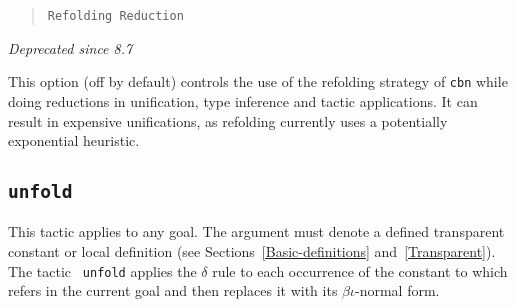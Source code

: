 \begin{coq_example*}

\begin{quote}
{\tt Refolding Reduction}
\end{quote}
\emph{Deprecated since 8.7}

This option (off by default) controls the use of the refolding strategy
of {\tt cbn} while doing reductions in unification, type inference and
tactic applications. It can result in expensive unifications, as
refolding currently uses a potentially exponential heuristic.

\subsection{\tt unfold \qualid}
\label{unfold}

This tactic applies to any goal. The argument {\qualid} must denote a
defined transparent constant or local definition (see Sections~\ref{Basic-definitions} and~\ref{Transparent}).  The tactic {\tt
  unfold} applies the $\delta$ rule to each occurrence of the constant
to which {\qualid} refers in the current goal and then replaces it
with its $\beta\iota$-normal form.

\begin{ErrMsgs}
\item {\qualid} 

\end{ErrMsgs}

\end{coq_example*}
